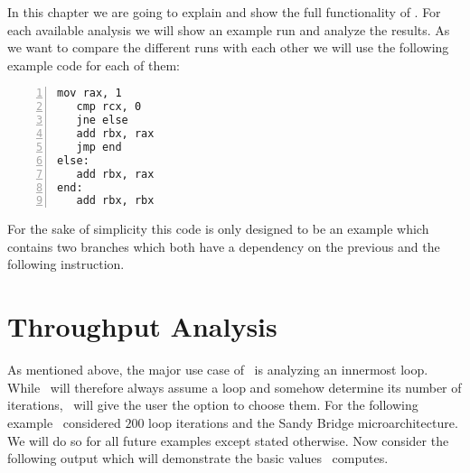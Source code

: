 In this chapter we are going to explain and show the full functionality of \suaca. For each available analysis we will show an example run and analyze the results. As we want to compare the different runs with each other we will use the following example code for each of them:

\begin{mdframed}[backgroundcolor=light-gray, roundcorner=10pt,leftmargin=1, rightmargin=1, innerleftmargin=15, innertopmargin=1,innerbottommargin=1, outerlinewidth=1, linecolor=light-gray]
\begin{lstlisting}[language={myLang}, basicstyle=\small, numbers=left]
   mov rax, 1
   cmp rcx, 0
   jne else
   add rbx, rax
   jmp end
else:
   add rbx, rax
end:
   add rbx, rbx
\end{lstlisting}
\end{mdframed}

For the sake of simplicity this code is only designed to be an example which contains two branches which both have a dependency on the previous and the following instruction.

\section{Throughput Analysis}
\label{sec:plain}

As mentioned above, the major use case of \iaca\ is analyzing an innermost loop. While \iaca\ will therefore always assume a loop and somehow determine its number of iterations, \suaca\ will give the user the option to choose them. For the following example \suaca\ considered $200$ loop iterations and the Sandy Bridge microarchitecture. We will do so for all future examples except stated otherwise. Now consider the following output which will demonstrate the basic values \suaca\ computes.



